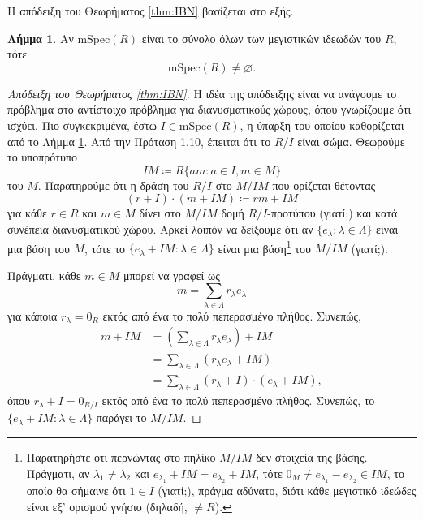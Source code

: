 \documentclass[12pt,a4paper,reqno]{amsart}
\theoremstyle{definition}
\newtheorem{lemma}[theorem]{Λήμμα}
\theoremstyle{remark}
\numberwithin{theorem}{section}
\numberwithin{exercise}{section}
\numberwithin{equation}{section}
\renewcommand{\emptyset}{\varnothing}
\newcommand{\mSpec}{\mathrm{mSpec}}
\begin{document}
Η απόδειξη του Θεωρήματος \ref{thm:IBN} βασίζεται στο εξής.
\begin{lemma}
\label{lem:maximal_ideal_existence}    
Αν $\mSpec(R)$ είναι το σύνολο όλων των μεγιστικών ιδεωδών του $R$, τότε 
\[
\mSpec(R) \neq \emptyset.
\]
\end{lemma}

\begin{proof}[Απόδειξη του Θεωρήματος \ref{thm:IBN}]
    Η ιδέα της απόδειξης είναι να ανάγουμε το πρόβλημα στο αντίστοιχο πρόβλημα για διανυσματικούς χώρους, όπου γνωρίζουμε ότι ισχύει. Πιο συγκεκρι\-μένα, έστω $I \in \mSpec(R)$, η ύπαρξη του οποίου καθορίζεται από το Λήμμα \ref{lem:maximal_ideal_existence}. Από την Πρόταση 1.10, έπειται ότι το $R/I$ είναι σώμα. Θεωρούμε το υποπρότυπο
    \[
    IM \coloneq R\{am : a \in I, m \in M\}
    \]
    του $M$. Παρατηρούμε ότι η δράση του $R/I$ στο $M/IM$ που ορίζεται θέτοντας 
    \[
    (r+I)\cdot(m+IM) \coloneqq rm + IM
    \]
    για κάθε $r \in R$ και $m \in M$ δίνει στο $M/IM$ δομή $R/I$-προτύπου (γιατί;) και κατά συνέπεια διανυσματικού χώρου. Αρκεί λοιπόν να δείξουμε ότι αν $\{e_\lambda : \lambda \in \Lambda\}$ είναι μια βάση του $M$, τότε το $\{e_\lambda + IM : \lambda \in \Lambda\}$ είναι μια βάση\footnote{Παρατηρήστε ότι περνώντας στο πηλίκο $M/IM$ δεν  στοιχεία της βάσης. Πράγματι, αν $\lambda_1 \neq \lambda_2$ και $e_{\lambda_1} + IM = e_{\lambda_2} +IM$, τότε $0_M \neq e_{\lambda_1} - e_{\lambda_2} \in IM$, το οποίο θα σήμαινε ότι $1 \in I$ (γιατί;), πράγμα αδύνατο, διότι κάθε μεγιστικό ιδεώδες είναι εξ' ορισμού γνήσιο (δηλαδή, $\neq R$).} του $M/IM$ (γιατί;).

    Πράγματι, κάθε $m \in M$ μπορεί να γραφεί ως 
    \[
    m = \sum_{\lambda \in \Lambda} r_\lambda e_\lambda
    \]
    για κάποια $r_\lambda=0_R$ εκτός από ένα το πολύ πεπερασμένο πλήθος. Συνεπώς,
    \begin{align*}
    m + IM 
    &= \left(\sum_{\lambda \in \Lambda} r_\lambda e_\lambda\right) + IM \\
    &= \sum_{\lambda \in \Lambda}\left(r_\lambda e_\lambda + IM\right) \\
    &= \sum_{\lambda \in \Lambda}\left(r_\lambda + I\right)\cdot\left(e_\lambda + IM\right),
    \end{align*}
    όπου $r_\lambda + I =0_{R/I}$ εκτός από ένα το πολύ πεπερασμένο πλήθος. Συνεπώς, το $\{e_\lambda + IM : \lambda \in \Lambda\}$ παράγει το $M/IM$.


\end{proof}
\end{document}
